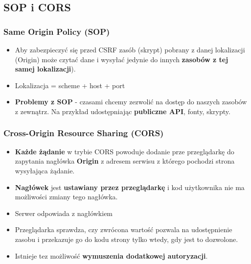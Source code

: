 \documentclass[../main.tex]{subfiles}
\begin{document}
    \subsection{SOP i CORS}
    \subsubsection{Same Origin Policy (SOP)}
    \begin{itemize}
        \item Aby zabezpieczyć się przed CSRF zasób (skrypt) pobrany z danej lokalizacji
        (Origin) może czytać dane i wysyłać jedynie do innych  \textbf{zasobów z tej samej
        lokalizacji}).
        \item Lokalizacja = scheme + host + port
        \item \textbf{Problemy z SOP} - czasami chcemy zezwolić na dostęp do naszych zasobów z zewnątrz. Na
        przykład udostępniając  \textbf{publiczne API}, fonty, skrypty.
    \end{itemize}

    \subsubsection{Cross-Origin Resource Sharing (CORS)}
    \begin{itemize}
        \item \textbf{Każde żądanie} w trybie CORS powoduje dodanie prze przeglądarkę do
        zapytania nagłówka \textbf{Origin} z adresem serwisu z którego pochodzi strona
        wysyłająca żądanie.
        \item \textbf{Nagłówek} jest \textbf{ustawiany przez przeglądarkę} i kod użytkownika nie ma
        możliwości zmiany tego nagłówka.
        \item Serwer odpowiada z nagłówkiem
        \item Przeglądarka sprawdza, czy zwrócona wartość pozwala na udostępnienie
        zasobu i przekazuje go do kodu strony tylko wtedy, gdy jest to dozwolone.
        \item Istnieje tez możliwość \textbf{wymuszenia dodatkowej autoryzacji}.
    \end{itemize}
\end{document}

